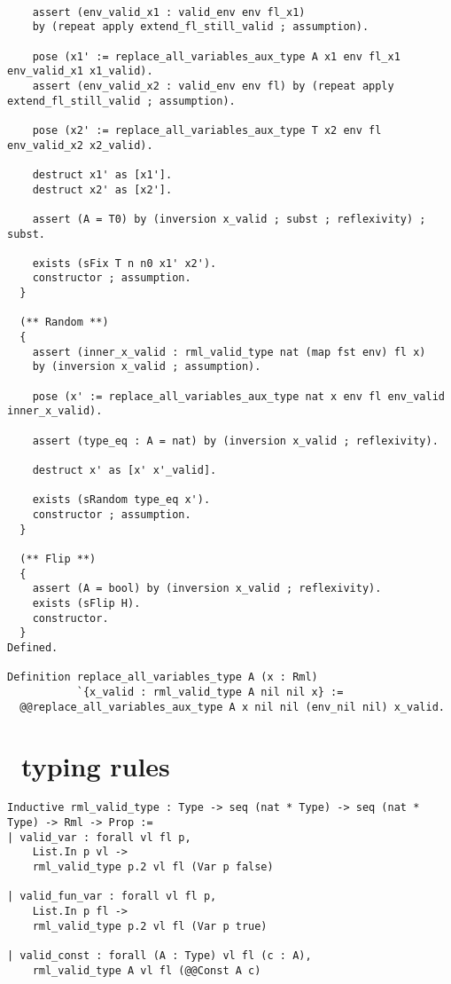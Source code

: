 \documentclass[11pt, leqno, titlepage]{article}
\theoremstyle{definition}
\begin{document}
\begin{appendices}
\begin{lstlisting}[language=coq]
    
    assert (env_valid_x1 : valid_env env fl_x1) 
    by (repeat apply extend_fl_still_valid ; assumption).
    
    pose (x1' := replace_all_variables_aux_type A x1 env fl_x1 env_valid_x1 x1_valid).
    assert (env_valid_x2 : valid_env env fl) by (repeat apply extend_fl_still_valid ; assumption).
    
    pose (x2' := replace_all_variables_aux_type T x2 env fl env_valid_x2 x2_valid).

    destruct x1' as [x1'].
    destruct x2' as [x2'].
    
    assert (A = T0) by (inversion x_valid ; subst ; reflexivity) ; subst.
    
    exists (sFix T n n0 x1' x2').
    constructor ; assumption.
  }

  (** Random **)
  {
    assert (inner_x_valid : rml_valid_type nat (map fst env) fl x) 
    by (inversion x_valid ; assumption).

    pose (x' := replace_all_variables_aux_type nat x env fl env_valid inner_x_valid).

    assert (type_eq : A = nat) by (inversion x_valid ; reflexivity).

    destruct x' as [x' x'_valid].
    
    exists (sRandom type_eq x').
    constructor ; assumption.
  }

  (** Flip **)
  {
    assert (A = bool) by (inversion x_valid ; reflexivity).
    exists (sFlip H).
    constructor.
  }
Defined.

Definition replace_all_variables_type A (x : Rml)
           `{x_valid : rml_valid_type A nil nil x} :=
  @@replace_all_variables_aux_type A x nil nil (env_nil nil) x_valid.

\end{lstlisting}
  \newpage
  \section{\rmlx\ typing rules}
  \label{appendix:rmltypes}
\begin{lstlisting}[language=coq]
Inductive rml_valid_type : Type -> seq (nat * Type) -> seq (nat * Type) -> Rml -> Prop :=
| valid_var : forall vl fl p,
    List.In p vl ->
    rml_valid_type p.2 vl fl (Var p false)

| valid_fun_var : forall vl fl p,
    List.In p fl ->
    rml_valid_type p.2 vl fl (Var p true)
                   
| valid_const : forall (A : Type) vl fl (c : A),
    rml_valid_type A vl fl (@@Const A c)
                   

\end{lstlisting}
\end{appendices}
\end{document}
